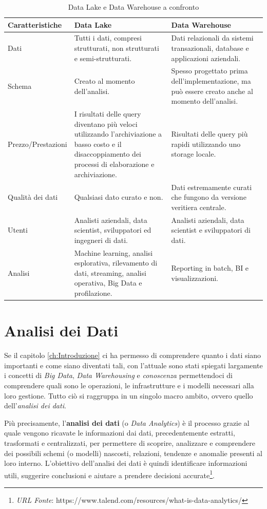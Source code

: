 \begin{longtable}{|p{4cm}|p{5cm}|p{5cm}|}
    \caption{Data Lake e Data Warehouse a confronto}
    \label{tab:data_lake_vs_data_warehouse} \\
    \hline
    \textbf{Caratteristiche} & \textbf{Data Lake} & \textbf{Data Warehouse}\\
    \hline
    \endfirsthead 

    Dati & Tutti i dati, compresi strutturati, non strutturati e semi-strutturati. & Dati relazionali da sistemi transazionali, database e applicazioni aziendali.\\
    \hline
    Schema & Creato al momento dell'analisi. & Spesso progettato prima dell'implementazione, ma può essere creato anche al momento dell'analisi.\\
    \hline 
    Prezzo/Prestazioni & I risultati delle query diventano più veloci utilizzando l'archiviazione a basso costo e il disaccoppiamento dei processi di elaborazione e archiviazione. & Risultati delle query più rapidi utilizzando uno storage locale.\\
    \hline
    Qualità dei dati & Qualsiasi dato curato e non. & Dati estremamente curati che fungono da versione veritiera centrale.\\
    \hline
    Utenti & Analisti aziendali, data scientist, sviluppatori ed ingegneri di dati. & Analisti aziendali, data scientist e sviluppatori di dati.\\
    \hline    
    Analisi & Machine learning, analisi esplorativa, rilevamento di dati, streaming, analisi operativa, Big Data e profilazione. & Reporting in batch, BI e visualizzazioni.\\
    \hline
\end{longtable}

\section{Analisi dei Dati}

Se il capitolo \ref{ch:Introduzione} ci ha permesso di comprendere quanto i dati siano importanti e come siano diventati tali, con l'attuale sono stati spiegati largamente i concetti di \textit{Big Data}, \textit{Data Warehousing} e \textit{conoscenza} permettendoci di comprendere quali sono le operazioni, le infrastrutture e i modelli necessari alla loro gestione. Tutto ciò si raggruppa in un singolo macro ambito, ovvero quello dell'\textit{analisi dei dati}.

Più precisamente, l'\textbf{analisi dei dati} (o \textit{Data Analytics}) è il processo grazie al quale vengono ricavate le informazioni dai dati, precedentemente estratti, trasformati e centralizzati, per permettere di scoprire, analizzare e comprendere dei possibili schemi (o modelli) nascosti, relazioni, tendenze e anomalie presenti al loro interno. L'obiettivo dell'analisi dei dati è quindi identificare informazioni utili, suggerire conclusioni e aiutare a prendere decisioni accurate\footnote{\textit{URL Fonte}: https://www.talend.com/resources/what-is-data-analytics/}.

